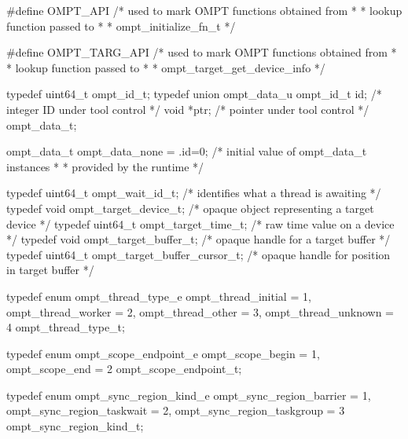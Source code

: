 \documentclass{article}
\begin{document}
\begin{boxedcode}
#define OMPT\_API                              /* used to mark OMPT functions obtained from   *
                                               * lookup function passed to                   *
                                               * ompt\_initialize\_fn\_t                        */
                                             
#define OMPT\_TARG\_API                         /* used to mark OMPT functions obtained from   *
                                               * lookup function passed to                   *
                                               * ompt\_target\_get\_device\_info                 */
                                             
typedef uint64\_t ompt\_id\_t;
typedef union ompt\_data\_u {
  ompt\_id\_t id;                               /* integer ID under tool control               */
  void *ptr;                                  /* pointer under tool control                  */
} ompt\_data\_t;

ompt\_data\_t ompt\_data\_none = {.id=0};         /* initial value of ompt\_data\_t instances      *
                                               * provided by the runtime                     */

typedef uint64\_t ompt\_wait\_id\_t;              /* identifies what a thread is awaiting        */
typedef void ompt\_target\_device\_t;            /* opaque object representing a target device  */
typedef uint64\_t ompt\_target\_time\_t;          /* raw time value on a device                  */
typedef void ompt\_target\_buffer\_t;            /* opaque handle for a target buffer           */ 
typedef uint64\_t ompt\_target\_buffer\_cursor\_t; /* opaque handle for position in target buffer */

typedef enum ompt\_thread\_type\_e {
  ompt\_thread\_initial                 = 1,
  ompt\_thread\_worker                  = 2,
  ompt\_thread\_other                   = 3,
  ompt\_thread\_unknown                 = 4
} ompt\_thread\_type\_t;

typedef enum ompt\_scope\_endpoint\_e {
  ompt\_scope\_begin                    = 1,
  ompt\_scope\_end                      = 2
} ompt\_scope\_endpoint\_t;

typedef enum ompt\_sync\_region\_kind\_e {
  ompt\_sync\_region\_barrier            = 1, 
  ompt\_sync\_region\_taskwait           = 2,
  ompt\_sync\_region\_taskgroup          = 3
} ompt\_sync\_region\_kind\_t;


\end{boxedcode}
\end{document}
